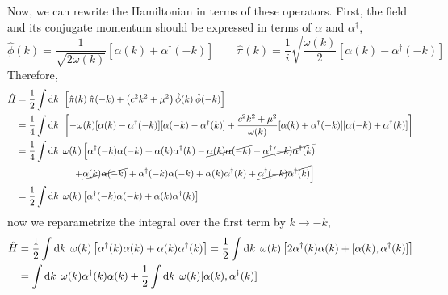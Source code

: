 \documentclass[12pt]{extarticle}
\begin{document}
Now, we can rewrite the Hamiltonian in terms of these operators. First, the field and its conjugate momentum should be expressed in terms of $\alpha$ and $\alpha^\dagger$,
\[\hat{\phi}(k) = \frac{1}{\sqrt{2 \omega(k)}} \left[ \alpha(k) + \alpha^\dagger(-k) \right] \quad \quad \hat{\pi}(k) = \frac{1}{i} \sqrt{\frac{\omega(k)}{2}} \left[ \alpha(k) - \alpha^\dagger(-k) \right]\]
Therefore,
\begin{align*}
\hat{H} & = \frac{1}{2}  \int \mathrm{d}k \: \: \left[ \hat{\pi}(k) \: \hat{\pi}(-k)  + \left(c^2 k^2  + \mu^2 \right) \hat{\phi}(k) \: \hat{\phi}(-k) \right] 
\\
& =  \frac{1}{4}  \int \mathrm{d}k \: \: \left[ - \omega(k) [\alpha(k) - \alpha^\dagger(-k)][\alpha(-k) - \alpha^\dagger(k)]  + \frac{c^2 k^2  + \mu^2}{\omega(k)}[\alpha(k) + \alpha^\dagger(-k)][\alpha(-k) + \alpha^\dagger(k)] \right]
\\
& = \frac{1}{4}  \int \mathrm{d}k \: \: \omega(k) \left[ \alpha^\dagger(-k) \alpha(-k) + \alpha(k) \alpha^\dagger(k) - \cancel{\alpha(k) \alpha(-k)} - \cancel{\alpha^\dagger(-k) \alpha^\dagger(k)} \right.
\\
& \left. \quad \quad \quad \quad \quad \quad + \cancel{\alpha(k) \alpha(-k)} + \alpha^\dagger(-k) \alpha(-k) + \alpha(k) \alpha^\dagger(k) + \cancel{\alpha^\dagger(-k) \alpha^\dagger(k)}  \right] 
\\
& = \frac{1}{2}  \int \mathrm{d}k \: \: \omega(k) \left[ \alpha^\dagger(-k) \alpha(-k) + \alpha(k) \alpha^\dagger(k) \right]
\end{align*}
now we reparametrize the integral over the first term by $k \to -k$,
\begin{align*}
\hat{H} & = \frac{1}{2}  \int \mathrm{d}k \: \: \omega(k) \left[ \alpha^\dagger(k) \alpha(k) + \alpha(k) \alpha^\dagger(k) \right] = \frac{1}{2}  \int \mathrm{d}k \: \: \omega(k) \left[ 2 \alpha^\dagger(k) \alpha(k) + [\alpha(k), \alpha^\dagger(k)] \right] \\
& =  \int \mathrm{d}k \: \: \omega(k) \alpha^\dagger(k) \alpha(k) + \frac{1}{2}  \int \mathrm{d}k \: \: \omega(k) [\alpha(k), \alpha^\dagger(k)]
\end{align*}
\end{document}

